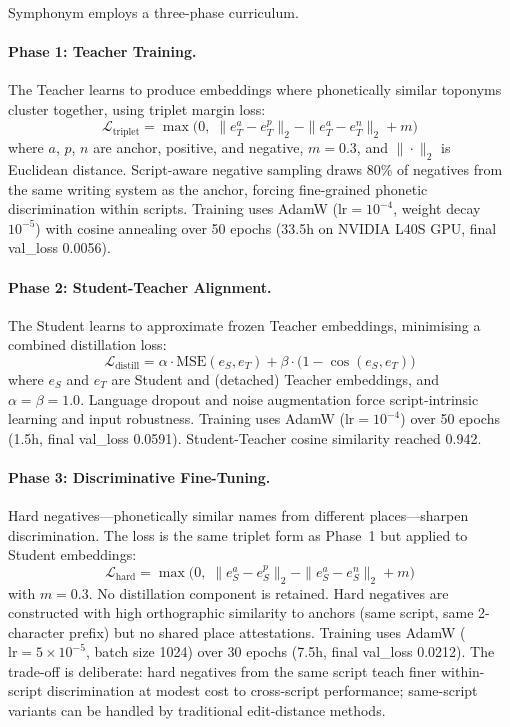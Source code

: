\documentclass[11pt,a4paper]{article}
\begin{document}
Symphonym employs a three-phase curriculum.

\paragraph{Phase 1: Teacher Training.} The Teacher learns to produce embeddings where phonetically similar toponyms cluster together, using triplet margin loss:
\begin{equation}
\mathcal{L}_{\text{triplet}} = \max\!\big(0,\; \|e_T^a - e_T^p\|_2 - \|e_T^a - e_T^n\|_2 + m\big)
\label{eq:phase1-loss}
\end{equation}
where $a$, $p$, $n$ are anchor, positive, and negative, $m = 0.3$, and $\|\cdot\|_2$ is Euclidean distance. Script-aware negative sampling draws 80\% of negatives from the same writing system as the anchor, forcing fine-grained phonetic discrimination within scripts. Training uses AdamW ($\text{lr} = 10^{-4}$, weight decay $10^{-5}$) with cosine annealing over 50 epochs (33.5h on NVIDIA L40S GPU, final val\_loss 0.0056).

\paragraph{Phase 2: Student-Teacher Alignment.} The Student learns to approximate frozen Teacher embeddings, minimising a combined distillation loss:
\begin{equation}
\mathcal{L}_{\text{distill}} = \alpha \cdot \text{MSE}(e_S, e_T) + \beta \cdot \big(1 - \cos(e_S, e_T)\big)
\label{eq:phase2-loss}
\end{equation}
where $e_S$ and $e_T$ are Student and (detached) Teacher embeddings, and $\alpha = \beta = 1.0$. Language dropout and noise augmentation force script-intrinsic learning and input robustness. Training uses AdamW ($\text{lr} = 10^{-4}$) over 50 epochs (1.5h, final val\_loss 0.0591). Student-Teacher cosine similarity reached 0.942.

\paragraph{Phase 3: Discriminative Fine-Tuning.} Hard negatives---phonetically similar names from different places---sharpen discrimination. The loss is the same triplet form as Phase~1 but applied to Student embeddings:
\begin{equation}
\mathcal{L}_{\text{hard}} = \max\!\big(0,\; \|e_S^a - e_S^p\|_2 - \|e_S^a - e_S^n\|_2 + m\big)
\label{eq:phase3-loss}
\end{equation}
with $m = 0.3$. No distillation component is retained. Hard negatives are constructed with high orthographic similarity to anchors (same script, same 2-character prefix) but no shared place attestations. Training uses AdamW ($\text{lr} = 5 \times 10^{-5}$, batch size 1024) over 30 epochs (7.5h, final val\_loss 0.0212). The trade-off is deliberate: hard negatives from the same script teach finer within-script discrimination at modest cost to cross-script performance; same-script variants can be handled by traditional edit-distance methods.
\end{document}
